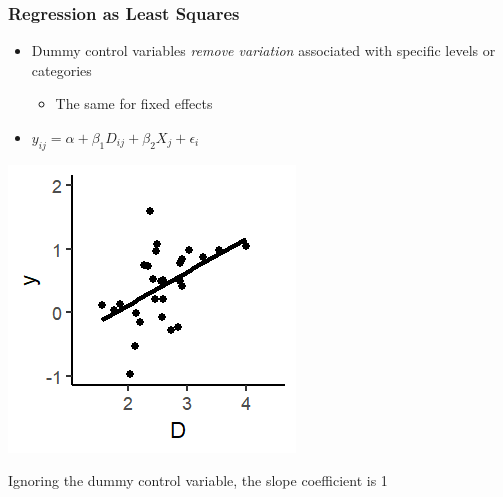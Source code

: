 \documentclass[xcolor=x11names,compress]{beamer}\usepackage[]{graphicx}\usepackage[]{color}
\makeatletter
\def\maxwidth{ %
  \ifdim\Gin@nat@width>\linewidth
    \linewidth
  \else
    \Gin@nat@width
  \fi
}
\newenvironment{knitrout}{}{} %
\renewcommand{\(}{\begin{columns}}
\renewcommand{\)}{\end{columns}}
\newcommand{\<}[1]{\begin{column}{#1}}
\renewcommand{\>}{\end{column}}
\makeatother
\begin{document}
\begin{frame}
\frametitle{Regression as Least Squares}
\begin{itemize}
\item Dummy control variables \textit{remove variation} associated with specific levels or categories
\begin{itemize}
\item The same for fixed effects
\end{itemize}
\item $y_{ij} = \alpha + \beta_1 D_{ij} + \beta_2 X_j + \epsilon_i$
\end{itemize}
\begin{multicols}{2}
\begin{knitrout}
\color{fgcolor}
\includegraphics[width=\maxwidth]{figure/graph_ols_FE1-1} 

\end{knitrout}
\columnbreak
Ignoring the dummy control variable, the slope coefficient is 1 
\end{multicols}
\end{frame}
\end{document}
